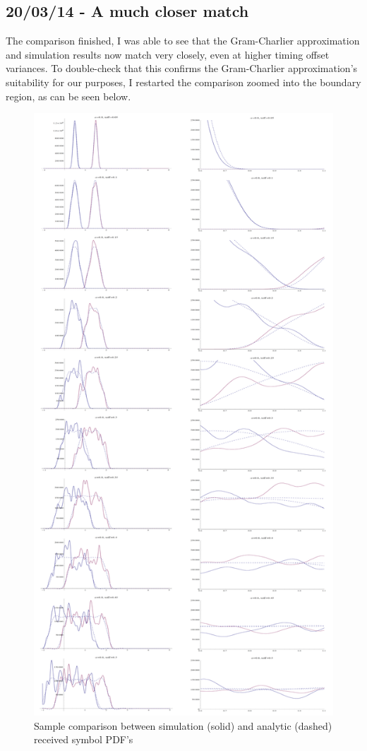 \subsection{20/03/14 - A much closer match}

The comparison finished, I was able to see that the Gram-Charlier
approximation and simulation results now match very closely, even at
higher timing offset variances. To double-check that this confirms the
Gram-Charlier approximation's suitability for our purposes, I restarted
the comparison zoomed into the boundary region, as can be seen below.

\begin{figure}[htbp]
\centering
\includegraphics[height=\textheight]{comparison_scaled.png}
\caption[Simulation vs. analytical received symbol PDFs]{Sample comparison between simulation (solid) and analytic
(dashed) received symbol PDF's}
\end{figure}

